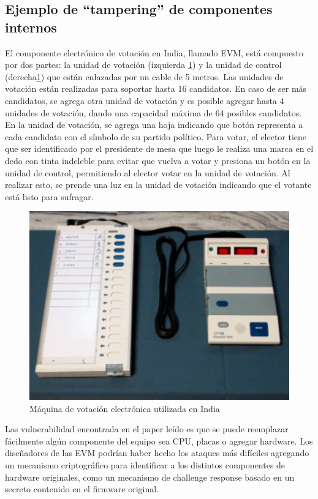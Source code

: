 \subsection{Ejemplo de ``tampering'' de componentes internos}

El componente electrónico de votación en India, llamado EVM, está compuesto por dos partes: la unidad de votación (izquierda \ref{fig:partsIndia}) y la unidad de control (derecha\ref{fig:partsIndia}) que están enlazadas por un cable de 5 metros. Las unidades de votación están realizadas para soportar hasta 16 candidatos. En caso de ser más candidatos, se agrega otra unidad de votación y es posible agregar hasta 4 unidades de votación, dando una capacidad máxima de 64 posibles candidatos. En la unidad de votación, se agrega una hoja indicando que botón representa a cada candidato con el símbolo de su partido político. Para votar, el elector tiene que ser identificado por el presidente de mesa que luego le realiza una marca en el dedo con tinta indeleble para evitar que vuelva a votar y presiona un botón en la unidad de control, permitiendo al elector votar en la unidad de votación. Al realizar esto, se prende una luz en la unidad de votación indicando que el votante está listo para sufragar.

\begin{figure}[H]
  \centering
  \includegraphics[scale=0.7]{Imagenes/almacenamiento1}
  \caption{Máquina de votación electrónica utilizada en India}
  \label{fig:partsIndia}
\end{figure}

Las vulnerabilidad encontrada en el paper leído es que se puede reemplazar fácilmente algún componente del equipo sea CPU, placas o agregar hardware\cite{india}. Los diseñadores de las EVM podrían haber hecho los ataques más difíciles agregando un mecanismo criptográfico para identificar a los distintos componentes de hardware originales, como un mecanismo de challenge response basado en un secreto contenido en el firmware original.

